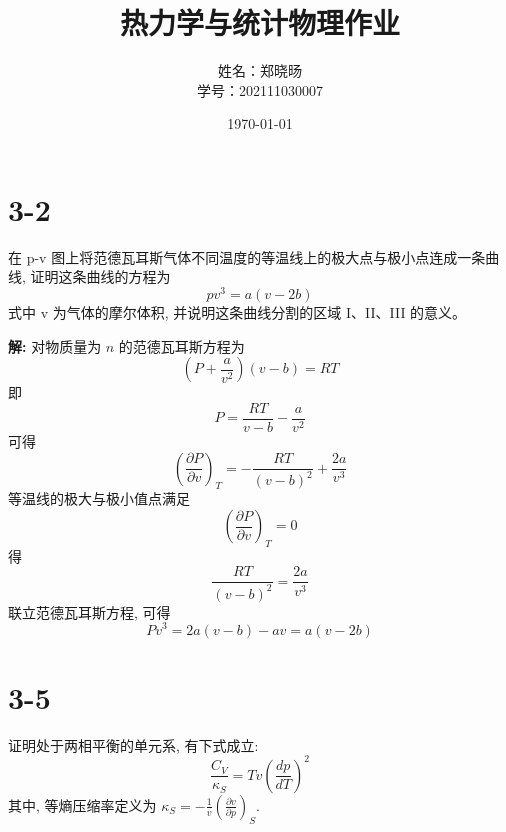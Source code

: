 \documentclass{article}
\title{热力学与统计物理作业}
\author{姓名：郑晓旸 \\ 学号：202111030007} %
\date{\today} %
\begin{document}
\maketitle %
\section*{3-2}
在 p-v 图上将范德瓦耳斯气体不同温度的等温线上的极大点与极小点连成一条曲线, 证明这条曲线的方程为
\[ pv^3 = a(v - 2b) \]
式中 v 为气体的摩尔体积, 并说明这条曲线分割的区域 I、II、III 的意义。

\textbf{解:} 对物质量为 $n$ 的范德瓦耳斯方程为
\[ \left( P + \frac{a}{v^2} \right) (v - b) = RT \]
即
\[ P = \frac{RT}{v-b} - \frac{a}{v^2} \]
可得
\[ \left( \frac{\partial P}{\partial v} \right)_T = - \frac{RT}{(v-b)^2} + \frac{2a}{v^3} \]
等温线的极大与极小值点满足
\[ \left( \frac{\partial P}{\partial v} \right)_T = 0 \]
得
\[ \frac{RT}{(v-b)^2} = \frac{2a}{v^3} \]
联立范德瓦耳斯方程, 可得
\[ Pv^3 = 2a(v-b) - av = a(v-2b) \]

\hrulefill

\section*{3-5}
证明处于两相平衡的单元系, 有下式成立:
\[ \frac{C_V}{\kappa_S} = T v \left( \frac{dp}{dT} \right)^2 \]
其中, 等熵压缩率定义为 $\kappa_S = -\frac{1}{v} \left( \frac{\partial v}{\partial p} \right)_S$.
\end{document}
